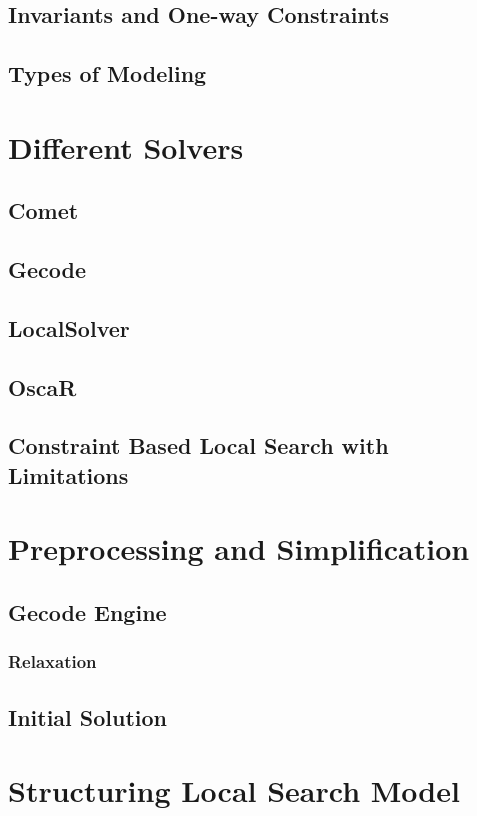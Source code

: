 \documentclass[a4paper,12pt]{article}
\begin{document}
    \subsection{Invariants and One-way Constraints}
  \subsection{Types of Modeling }

\section{Different Solvers }
  \subsection{Comet}

  \subsection{Gecode}
  \subsection{LocalSolver}
  \subsection{OscaR}
  \subsection{ Constraint Based Local Search with Limitations} %
\section{Preprocessing and Simplification}
  \subsection{Gecode Engine}
    \subsubsection{Relaxation}
  \subsection{Initial Solution}
\section{Structuring Local Search Model}

\end{document}
